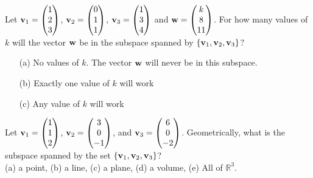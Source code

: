 \begin{problem}
    Let ${\bf v}_1 = \begin{pmatrix} 1 \\ 2 \\ 3 \end{pmatrix}$, ${\bf v}_2 = \begin{pmatrix} 0 \\
        1 \\ 1 \end{pmatrix}$, ${\bf v}_3 = \begin{pmatrix} 1 \\ 3 \\ 4 \end{pmatrix}$ and
            ${\bf w} = \begin{pmatrix} k \\ 8 \\ 11\end{pmatrix}$.  For how many values of $k$
                will the vector ${\bf w}$ be in the subspace spanned by
                $\{{\bf v}_1,{\bf v}_2,{\bf v}_3\}$?
    \begin{enumerate}
        \item[(a)] No values of $k$.  The vector ${\bf w}$ will never be in this subspace.
        \item[(b)] Exactly one value of $k$ will work
        \item[(c)] Any value of $k$ will work
    \end{enumerate}
\end{problem}

%         

\begin{problem}
    Let ${\bf v}_1 = \begin{pmatrix} 1 \\ 1 \\ 2 \end{pmatrix}$, ${\bf v}_2 = \begin{pmatrix} 3 \\
        0 \\ -1 \end{pmatrix}$, and ${\bf v}_3 = \begin{pmatrix} 6 \\ 0 \\ -2 \end{pmatrix}$.
            Geometrically, what is the subspace spanned by the set $\{{\bf v}_1, {\bf v}_2,
            {\bf v}_3\}$?\\
        (a) a point, \quad
        (b) a line, \quad  
        (c) a plane, \quad 
        (d) a volume, \quad   
        (e) All of $\mathbb{R}^3$.
\end{problem}

